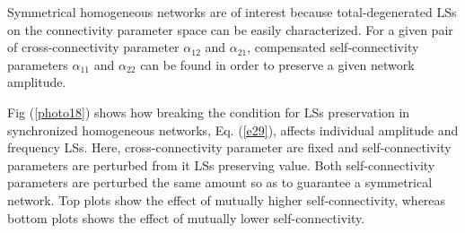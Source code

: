 Symmetrical homogeneous networks are of interest because total-degenerated  LSs on the connectivity parameter space can be easily characterized. For a given pair of cross-connectivity parameter $\alpha_{12}$ and $\alpha_{21}$, compensated self-connectivity parameters $\alpha_{11}$ and $\alpha_{22}$ can be found in order to preserve a given network amplitude.

Fig (\ref{photo18}) shows how breaking the condition for LSs preservation in synchronized homogeneous networks, Eq. (\ref{e29}), affects individual amplitude and frequency LSs. Here, cross-connectivity parameter are fixed and self-connectivity parameters are perturbed from it LSs preserving value. Both self-connectivity parameters are perturbed the same amount so as to guarantee a symmetrical network. Top plots show the effect of mutually higher self-connectivity, whereas bottom plots shows the effect of mutually lower self-connectivity. 

